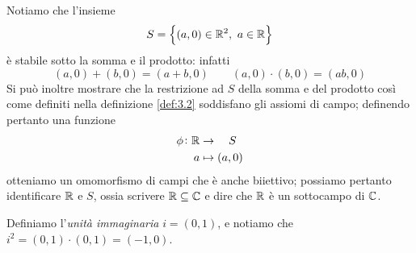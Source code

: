 \begin{remark}
    Notiamo che l'insieme 
    \[
    S = \left\{ (a,0)\in \amsbb{R}^2, \ a\in\amsbb{R}\right\}
    \]
    è stabile sotto la somma e il prodotto: infatti
    \[
    (a,0)+(b,0) = (a+b, 0) \qquad (a,0)\cdot(b,0) = (ab, 0)
    \]
    Si può inoltre mostrare che la restrizione ad $S$ della somma e del prodotto così come definiti nella definizione \ref{def:3.2} soddisfano gli assiomi di campo; definendo pertanto una funzione
    \[
    \begin{split}
        \phi\colon \amsbb{R} &\to \quad S\\
        a &\mapsto(a,0)
    \end{split}
    \]
    otteniamo un omomorfismo di campi che è anche biiettivo; possiamo pertanto identificare $\amsbb{R}$ e $S$, ossia scrivere $\amsbb{R}\subseteq \amsbb{C}$ e dire che $\amsbb{R}$ è un sottocampo di $\amsbb{C}$.
\end{remark}
\begin{definition}
    \label{def:3.3}
    Definiamo l'\emph{unità immaginaria} $i=(0,1)$, e notiamo che $i^2 = (0,1)\cdot(0,1) = (-1,0)$.
\end{definition}
